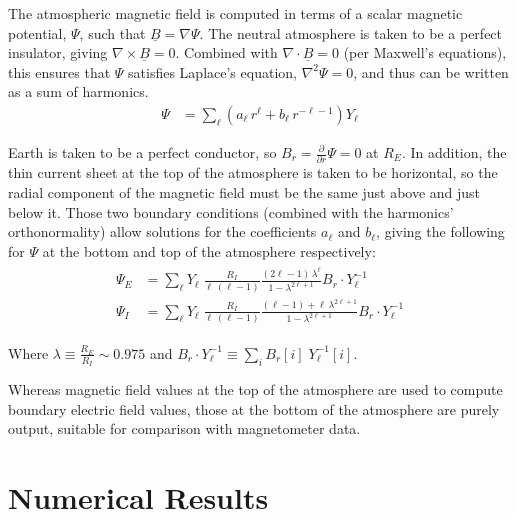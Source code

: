 \documentclass{article}
\renewcommand{\vec}[1]{\ensuremath{\underline{#1}}}
\newcommand{\dd}[1]{\ensuremath{ \frac{\partial}{\partial #1} }\xspace}
\newcommand{\curl}[1]{\ensuremath{ \nabla \times \vec{#1} }\xspace}
\renewcommand{\div}[1]{\ensuremath{ \nabla \cdot \vec{#1} }\xspace}
\newcommand{\grad}[1]{\ensuremath{ \nabla #1 }\xspace}
\newcommand{\lr}[1]{ \left( #1 \right) }
\begin{document}
The atmospheric magnetic field is computed in terms of a scalar magnetic
potential, $\Psi$, such that $\vec{B}=\grad{\Psi}$. The neutral
atmosphere is taken to be a perfect insulator, giving $\curl{B}=0$.
Combined with $\div{B}=0$ (per Maxwell's equations), this ensures that
$\Psi$ satisfies Laplace's equation, $\nabla^2 \Psi = 0$, and thus can
be written as a sum of harmonics.
\begin{align}
  \label{psi_expansion}
  \Psi &= \displaystyle\sum_\ell \lr{ a_\ell \, r^\ell +
    b_\ell \, r^{-\ell - 1} } Y_\ell
\end{align}

Earth is taken to be a perfect conductor, so $B_r = \dd{r} \Psi = 0$ at
$R_E$. In addition, the thin current sheet at the top of the atmosphere
is taken to be horizontal, so the radial component of the magnetic field
must be the same just above and just below it. Those two boundary
conditions (combined with the harmonics' orthonormality) allow solutions
for the coefficients $a_\ell$ and $b_\ell$, giving the
following for $\Psi$ at the bottom and top of the atmosphere
respectively:
\begin{align}
  \label{psi_final}
  \begin{split}
  \Psi_E &= \displaystyle\sum_\ell Y_\ell \; \frac{R_I}{ \ell \, \lr{\ell - 1} } \frac{ \lr{2 \ell - 1} \, \lambda^\ell }{ 1 - \lambda^{2 \ell + 1} } B_r \cdot Y_\ell^{-1} \\
  \Psi_I &= \displaystyle\sum_\ell Y_\ell \; \frac{R_I}{ \ell \, \lr{\ell - 1} } \frac{ \lr{\ell - 1} + \ell \, \lambda^{2 \ell + 1} }{ 1 - \lambda^{2 \ell + 1} } B_r \cdot Y_\ell^{-1}
  \end{split}
\end{align}

Where $\lambda \equiv \frac{R_E}{R_I} \sim \num{0.975}$ and $B_r \cdot Y_\ell^{-1} \equiv \displaystyle\sum_i B_r [i] \; Y_\ell^{-1} \! [i]$.

Whereas magnetic field values at the top of the atmosphere are used to
compute boundary electric field values, those at the bottom of the
atmosphere are purely output, suitable for comparison with magnetometer
data.


\section{Numerical Results}
\end{document}
